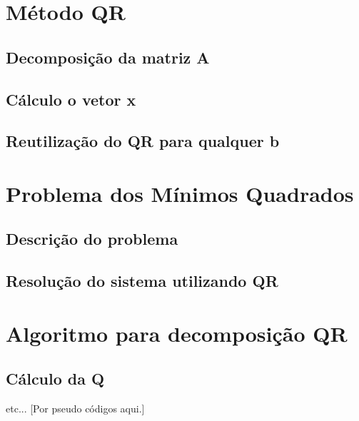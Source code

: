 \chapter{Método QR}

	\section{Decomposição da matriz A}

	\section{Cálculo o vetor x}

	\section{Reutilização do QR para qualquer b}


\chapter{Problema dos Mínimos Quadrados}

	\section{Descrição do problema}

	\section{Resolução do sistema utilizando QR}


\chapter{Algoritmo para decomposição QR}

\section{Cálculo da Q}
etc... [Por pseudo códigos aqui.]
